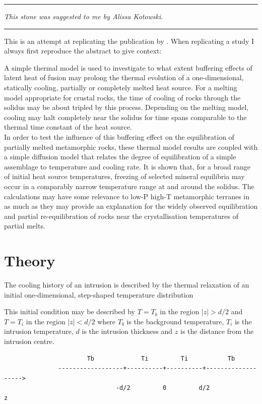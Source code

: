 \par\noindent\rule{\textwidth}{0.4pt}

{\sl This stone was suggested to me by Alissa Kotowski}. 

\par\noindent\rule{\textwidth}{0.4pt}


This is an attempt at replicating the publication by . 
When replicating a study I always first reproduce the abstract to give context:
\begin{displayquote}
{\color{darkgray}
A simple thermal model is used to investigate to what extent buffering effects 
of latent heat of fusion may prolong the thermal evolution of a one-dimensional, 
statically cooling, partially or completely melted heat source.
For a melting model appropriate for crustal rocks, the time of cooling of rocks 
through the solidus may be about tripled by this process. Depending on the melting 
model, cooling may halt completely near the solidus for time spans
comparable to the thermal time constant of the heat source.\\
In order to test the influence of this buffering effect on the equilibration of 
partially melted metamorphic rocks, these thermal model results are coupled with 
a simple diffusion model that relates the degree of equilibration of a
simple assemblage to temperature and cooling rate. It is shown that, for a broad 
range of initial heat source temperatures, freezing of selected mineral equilibria 
may occur in a comparably narrow temperature range at and
around the solidus. The calculations may have some relevance to low-P high-T 
metamorphic terranes in as much as they may provide an explanation for the widely 
observed equilibration and partial re-equilibration of rocks near the
crystallisation temperatures of partial melts.}
\end{displayquote}

\newpage
\section*{Theory}

The cooling history of an intrusion is described by the
thermal relaxation of an initial one-dimensional,
step-shaped temperature distribution

This initial condition may be described by $T=T_b$ in the region
$|z|>d/2$ and $T=T_i$ in the region $|z|<d/2$
where $T_b$ is the background temperature,
$T_i$ is the intrusion temperature, $d$ is the intrusion
thickness and $z$ is the distance from the intrusion centre. 
\begin{small}
\begin{verbatim}
                       Tb             Ti         Ti           Tb
               ------------------+----------+----------+-------------------> 
                               -d/2         0         d/2                  z
\end{verbatim}
\end{small}

